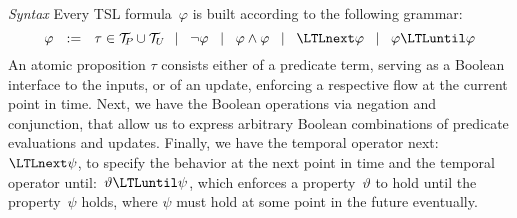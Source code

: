 \noindent \textit{Syntax} Every TSL formula~$ \varphi $ is built
according to the following grammar:
%
\begin{equation*}
  \varphi \ \ := \ \
  \term \in \pterms\cup \uterms
  \!\sep\! \neg \varphi
  \!\sep\! \varphi \wedge \varphi
  \!\sep\! \LTLnext \varphi
  \!\sep\! \varphi \LTLuntil \varphi
\end{equation*}
%
An atomic proposition $\tau$ consists either of a predicate term, serving as a
Boolean interface to the inputs, or of an update, enforcing a
respective flow at the current point in time. Next, we have the
Boolean operations via negation and conjunction, that allow us to express
arbitrary Boolean combinations of predicate evaluations and
updates. Finally, we have the temporal operator next:
$ \LTLnext \psi $, to specify the behavior at the next point in time
and the temporal operator until:~$ \vartheta \LTLuntil \psi $, which
enforces a property~$ \vartheta $ to hold until the property~$ \psi $
holds, where $ \psi $ must hold at some point in the future
eventually.
%
\medskip
\smallskip

